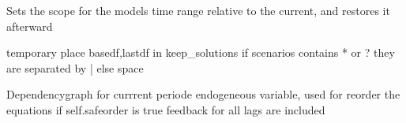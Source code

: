 \documentclass[letterpaper,10pt,english]{sphinxmanual}
\begin{document}
\begin{fulllineitems}
\begin{fulllineitems}
\begin{quote}
\begin{description}
\begin{itemize}
\end{itemize}

\end{description}\end{quote}

\end{fulllineitems}


\begin{fulllineitems}
\label{\detokenize{core/modelclass:modelclass.BaseModel.set_smpl_relative}}
\pysigstartsignatures
{}
\pysigstopsignatures
\sphinxAtStartPar
Sets the scope for the models time range relative to the current, and restores it afterward

\end{fulllineitems}


\begin{fulllineitems}
\label{\detokenize{core/modelclass:modelclass.BaseModel.keepswitch}}
\pysigstartsignatures
{}
\pysigstopsignatures
\sphinxAtStartPar
temporary place basedf,lastdf in keep\_solutions
if scenarios contains * or ? they are separated by | else space

\end{fulllineitems}


\begin{fulllineitems}
\label{\detokenize{core/modelclass:modelclass.BaseModel.endograph}}
\pysigstartsignatures
{}
\pysigstopsignatures
\sphinxAtStartPar
Dependencygraph for currrent periode endogeneous variable, used for reorder the equations
if self.safeorder is true feedback for all lags are included


\end{fulllineitems}
\end{fulllineitems}
\end{document}
